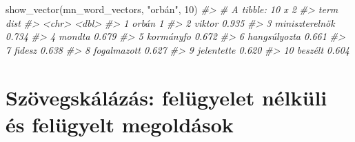 \documentclass[
]{book}
\newenvironment{Shaded}{\begin{snugshade}}{\end{snugshade}}
\newcommand{\CommentTok}[1]{\textcolor[rgb]{0.56,0.35,0.01}{\textit{#1}}}
\newcommand{\DecValTok}[1]{\textcolor[rgb]{0.00,0.00,0.81}{#1}}
\newcommand{\FunctionTok}[1]{\textcolor[rgb]{0.00,0.00,0.00}{#1}}
\newcommand{\NormalTok}[1]{#1}
\newcommand{\StringTok}[1]{\textcolor[rgb]{0.31,0.60,0.02}{#1}}
\begin{document}
\begin{Shaded}
\begin{Highlighting}[]
\FunctionTok{show\_vector}\NormalTok{(mn\_word\_vectors, }\StringTok{"orbán"}\NormalTok{, }\DecValTok{10}\NormalTok{)}
\CommentTok{\#\textgreater{} \# A tibble: 10 x 2}
\CommentTok{\#\textgreater{}    term            dist}
\CommentTok{\#\textgreater{}    \textless{}chr\textgreater{}          \textless{}dbl\textgreater{}}
\CommentTok{\#\textgreater{}  1 orbán          1    }
\CommentTok{\#\textgreater{}  2 viktor         0.935}
\CommentTok{\#\textgreater{}  3 miniszterelnök 0.734}
\CommentTok{\#\textgreater{}  4 mondta         0.679}
\CommentTok{\#\textgreater{}  5 kormányfo      0.672}
\CommentTok{\#\textgreater{}  6 hangsúlyozta   0.661}
\CommentTok{\#\textgreater{}  7 fidesz         0.638}
\CommentTok{\#\textgreater{}  8 fogalmazott    0.627}
\CommentTok{\#\textgreater{}  9 jelentette     0.620}
\CommentTok{\#\textgreater{} 10 beszélt        0.604}
\end{Highlighting}
\end{Shaded}

\hypertarget{szuxf6vegskuxe1luxe1zuxe1s-feluxfcgyelet-nuxe9lkuxfcli-uxe9s-feluxfcgyelt-megolduxe1sok}{%
\chapter{Szövegskálázás: felügyelet nélküli és felügyelt
megoldások}\label{szuxf6vegskuxe1luxe1zuxe1s-feluxfcgyelet-nuxe9lkuxfcli-uxe9s-feluxfcgyelt-megolduxe1sok}}
\end{document}
